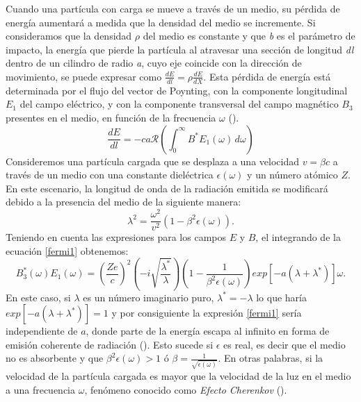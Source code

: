 Cuando una partícula con carga se mueve a través de un medio, su pérdida de energía aumentará a medida que la densidad del medio se incremente. Si consideramos que la densidad $\rho$ del medio es constante y que \textit{b} es el parámetro de impacto, la energía que pierde la partícula al atravesar una sección de longitud \textit{dl} dentro de un cilindro de radio \textit{a}, cuyo eje coincide con la dirección de movimiento, se puede expresar como $\frac{dE}{dl} = \rho \frac{dE}{dX}$. Esta pérdida de energía está determinada por el flujo del vector de Poynting, con la componente longitudinal $E_{1}$ del campo eléctrico, y con la componente transversal del campo magnético $B_{3}$ presentes en el medio, en función de la frecuencia $\omega$ (\cite{fermi_1940}).
\begin{equation}
    \frac{dE}{dl} = -ca \mathcal{R}\left(\int_{0}^{\infty} B^{*}E_{1}(\omega) \, d\omega\right)
    \label{fermi1}
\end{equation}
Consideremos una partícula cargada que se desplaza a una velocidad $v=\beta c$ a través de un medio con una constante dieléctrica $\epsilon(\omega)$ y un número atómico $Z$. En este escenario, la longitud de onda de la radiación emitida se modificará debido a la presencia del medio de la siguiente manera:
\begin{equation}
\lambda^{2}=\frac{\omega^{2}}{v^{2}}(1-\beta^{2}\epsilon(\omega)).
\label{lamdamod}
\end{equation}
Teniendo en cuenta las expresiones para los campos $E$ y $B$, el integrando de la ecuación \ref{fermi1} obtenemos:
\begin{equation}
B^{*}_{3}(\omega)E_{1}(\omega)=\left(\frac{Ze}{c}\right)^2 \left(-i\sqrt{\frac{\lambda^{*}}{\lambda}}\right)\left(1-\frac{1}{\beta^{2}\epsilon(\omega)}\right)exp[-a(\lambda+\lambda^{*})]\omega.
\end{equation}
En este caso, si $\lambda$ es un número imaginario puro, $\lambda^{*}=-\lambda$ lo que haría 
$exp[-a(\lambda+\lambda^{*})] = 1$ y por consiguiente la expresión \ref{fermi1} sería independiente de $a$, donde parte de la energía escapa al infinito en forma de emisión coherente de radiación (\cite{asorey_2012}). Esto sucede si $\epsilon$ es real, es decir que el medio no es absorbente y que $\beta^{2}\epsilon(\omega)>1$ ó $\beta=\frac{1}{\sqrt{\epsilon(\omega)}}$. En otras palabras, si la velocidad de la partícula cargada es mayor que la velocidad de la luz en el medio a una frecuencia $\omega$, fenómeno conocido como \textit{Efecto Cherenkov} (\cite{asorey_2012}).

